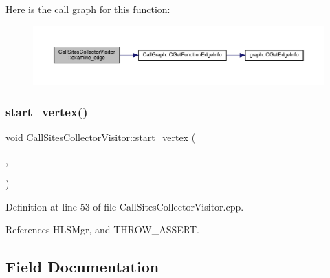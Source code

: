 Here is the call graph for this function\+:
\nopagebreak
\begin{figure}[H]
\begin{center}
\leavevmode
\includegraphics[width=350pt]{d2/da7/classCallSitesCollectorVisitor_aed0f4e539fe2c7d2af41e77ec74757d4_cgraph}
\end{center}
\end{figure}
\mbox{\label{classCallSitesCollectorVisitor_a8acc3ce8e9df345ac06d6afc776047f1}} 
\subsubsection{\texorpdfstring{start\+\_\+vertex()}{start\_vertex()}}
{\footnotesize\ttfamily void Call\+Sites\+Collector\+Visitor\+::start\+\_\+vertex (\begin{DoxyParamCaption}\item[{const \hyperlink{graph_8hpp_abefdcf0544e601805af44eca032cca14}{vertex} \&}]{,  }\item[{const \hyperlink{classCallGraph}{Call\+Graph} \&}]{ }\end{DoxyParamCaption})}



Definition at line 53 of file Call\+Sites\+Collector\+Visitor.\+cpp.



References H\+L\+S\+Mgr, and T\+H\+R\+O\+W\+\_\+\+A\+S\+S\+E\+RT.



\subsection{Field Documentation}
\mbox{\label{classCallSitesCollectorVisitor_ac787c83ad36341c3d7563758e613dd23}} 
